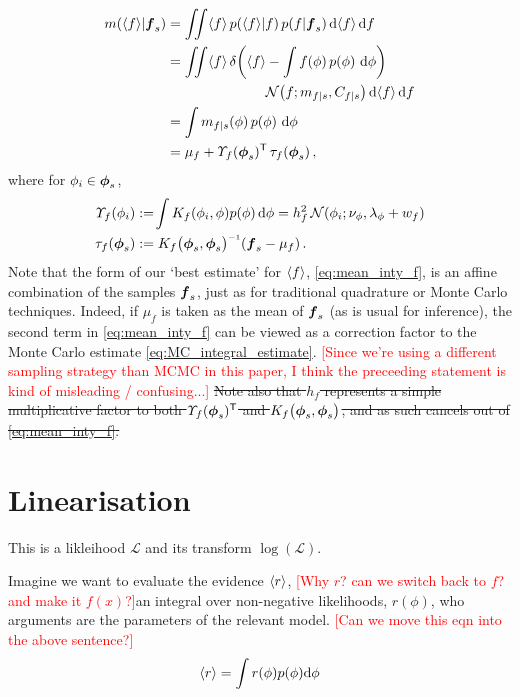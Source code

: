 \documentclass{article}
\newcommand{\lfn}{\mathcal{L}}   %
\newcommand{\ltfm}{\log(\mathcal{L})}  %
\begin{document}
\begin{align} \label{eq:mean_inty_f}
\mean{\inty{f}}{\vf_s}
& 
=\iint \inty{f}\,\p{\inty{f}}{f}\p{f}{\vf_s} \ud \inty{f} \,\ud f                                                                                                                                                               \nonumber\\
&
 =\iint \inty{f}\,\dd{\inty{f}}{\int f(\phi)\,\po{\phi}\,\ud\phi}
\nonumber\\
&\hspace{2.5cm}
\N{f}{\meancondfn{f}{s}}{\covcondfn{f}{s}} \ud \inty{f} \,\ud f \nonumber\\
&
 = \int \meancondfn{f}{s}(\phi)\,\po{\phi}\,\ud\phi\nonumber\\
&
 = 
\mu_f + \ntT{s}{f}\, \dtt{s}{f}
\,,
\end{align}
where for $\phi_i \in \vph_s$,
\begin{align*}
\fnt{\phi_i}{f} & \deq \!\int K_f(\phi_i,\phi)\po{\phi}\ud\phi
 = h_f^2\,\N{\phi_i}{\nu_{\phi}}{\lambda_{\phi}+w_{f}}\\
\dtt{s}{f} & \deq K_{f}\bigl(\vph_s,\vph_s\bigr)\inv (\vf_s-{\mu}_{f})\,.
\end{align*}
Note that the form of our `best estimate' for $\inty{f}$, \eqref{eq:mean_inty_f}, is an affine combination of the samples $\vf_s$, just as for traditional quadrature or Monte Carlo techniques. Indeed, if $\mu_f$ is taken as the mean of $\vf_s$ (as is usual for \gpb inference), the second term in \eqref{eq:mean_inty_f} can be viewed as a correction factor to the Monte Carlo estimate \eqref{eq:MC_integral_estimate}. \textcolor{red}{[Since we're using a different sampling strategy than MCMC in this paper, I think the preceeding statement is kind of misleading / confusing...]}
\sout{Note also that $h_f$ represents a simple multiplicative factor to both $\ntT{s}{f}$ and $K_{f}\bigl(\vph_s,\vph_s\bigr)$, and as such cancels out of \eqref{eq:mean_inty_f}.} 



\section{Linearisation}

This is a likleihood $\lfn$ and its transform $\ltfm$.

Imagine we want to evaluate the evidence $\inty{r}$, \textcolor{red}{[Why $r$? can we switch back to $f$? and make it $f(x)$?]}an integral over non-negative likelihoods, $r(\phi)$, who arguments are the parameters of the relevant model. \textcolor{red}{[Can we move this eqn into the above sentence?]}
$$
\inty{r} = \int r(\phi) p(\phi) \ud\phi
$$
\end{document}
